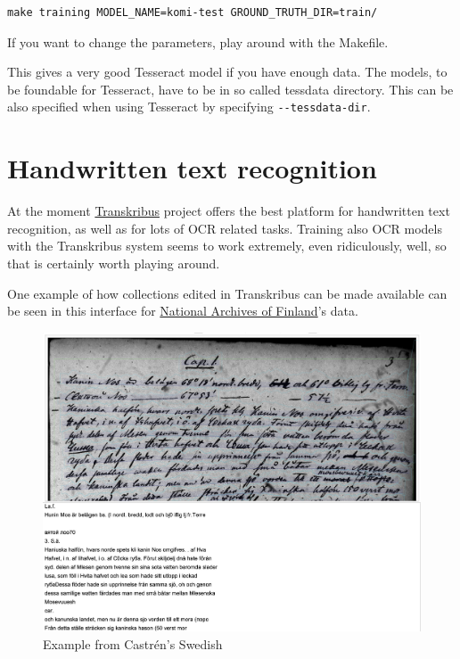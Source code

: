 \documentclass[]{book}
\begin{document}
\begin{verbatim}
make training MODEL_NAME=komi-test GROUND_TRUTH_DIR=train/
\end{verbatim}

If you want to change the parameters, play around with the Makefile.

This gives a very good Tesseract model if you have enough data. The models, to be foundable for Tesseract, have to be in so called tessdata directory. This can be also specified when using Tesseract by specifying \texttt{-\/-tessdata-dir}.

\hypertarget{htr}{%
\chapter{Handwritten text recognition}\label{htr}}

At the moment \href{https://transkribus.eu}{Transkribus} project offers the best platform for handwritten text recognition, as well as for lots of OCR related tasks. Training also OCR models with the Transkribus system seems to work extremely, even ridiculously, well, so that is certainly worth playing around.

One example of how collections edited in Transkribus can be made available can be seen in this interface for \href{https://transkribus.eu/r/kansallisarkisto/}{National Archives of Finland}'s data.

\begin{figure}
\centering
\includegraphics{images/transkribus_castren.jpg}
\caption{Example from Castrén's Swedish}
\end{figure}
\end{document}
